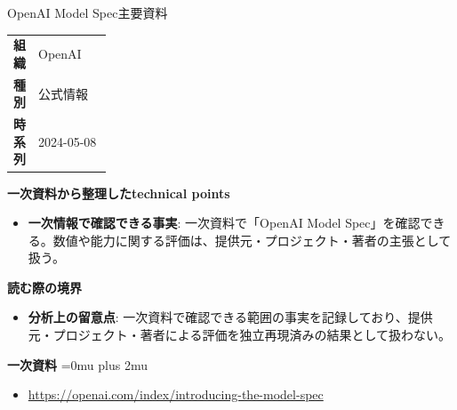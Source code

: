 \begin{technicalnote}{OpenAI Model Spec}{主要資料}
\begingroup
\begin{tabularx}{\linewidth}{@{}>{\bfseries}p{0.22\linewidth}X@{}}
組織 & OpenAI \\
種別 & 公式情報 \\
時系列 & 2024-05-08 \\
\end{tabularx}
\smallskip
{\bfseries 一次資料から整理したtechnical points}
\begin{itemize}[leftmargin=1.5em,itemsep=0.35em]
\item \textbf{一次情報で確認できる事実}: 一次資料で「OpenAI Model Spec」を確認できる。数値や能力に関する評価は、提供元・プロジェクト・著者の主張として扱う。
\end{itemize}
\begin{minipage}{\linewidth}
{\bfseries 読む際の境界}
\begin{itemize}[leftmargin=1.5em,itemsep=0.35em]
\item \textbf{分析上の留意点}: 一次資料で確認できる範囲の事実を記録しており、提供元・プロジェクト・著者による評価を独立再現済みの結果として扱わない。
\end{itemize}
\begin{samepage}
{\bfseries 一次資料}
\begingroup\sloppy
\Urlmuskip=0mu plus 2mu\relax
\begin{itemize}[leftmargin=1.5em,itemsep=0.25em]
\item {\scriptsize\url{https://openai.com/index/introducing-the-model-spec}}
\end{itemize}
\endgroup
\end{samepage}
\end{minipage}
\endgroup
\end{technicalnote}
\medskip

